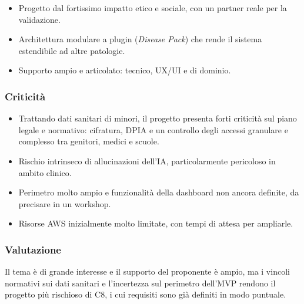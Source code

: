 \begin{itemize}
    \item Progetto dal fortissimo impatto etico e sociale, con un partner reale per la validazione.
    \item Architettura modulare a plugin (\emph{Disease Pack}) che rende il sistema estendibile ad altre patologie.
    \item Supporto ampio e articolato: tecnico, UX/UI e di dominio.
\end{itemize}

\subsubsection*{Criticità}

\begin{itemize}
    \item Trattando dati sanitari di minori, il progetto presenta forti criticità sul piano legale e normativo: cifratura, DPIA e un controllo degli accessi granulare e complesso tra genitori, medici e scuole.
    \item Rischio intrinseco di allucinazioni dell'IA, particolarmente pericoloso in ambito clinico.
    \item Perimetro molto ampio e funzionalità della dashboard non ancora definite, da precisare in un workshop.
    \item Risorse AWS inizialmente molto limitate, con tempi di attesa per ampliarle.
\end{itemize}

\subsubsection*{Valutazione}

Il tema è di grande interesse e il supporto del proponente è ampio, ma i vincoli normativi sui dati sanitari e l'incertezza sul perimetro dell'MVP rendono il progetto più rischioso di C8, i cui requisiti sono già definiti in modo puntuale.
